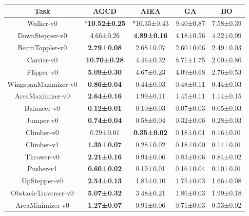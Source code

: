 \documentclass{article}
\begin{document}
    \begin{table}[H]
        \centering
        \small
        \begin{tabular}{ccccc}
            \toprule \textbf{Task} & \textbf{AGCD}        & \textbf{AIEA}      & \textbf{GA} & \textbf{BO} \\
            \midrule Walker-v0     & *\textbf{10.52±0.25} & *10.35±0.43        & 9.40±0.87   & 7.58±0.39   \\
            DownStepper-v0         & 4.66±0.26            & \textbf{4.89±0.16} & 4.18±0.56   & 4.22±0.09   \\
            BeamToppler-v0         & \textbf{2.79±0.08}   & 2.68±0.07          & 2.60±0.06   & 2.49±0.03   \\
            Carrier-v0             & \textbf{10.70±0.28}  & 4.46±0.32          & 8.71±1.75   & 2.00±0.86   \\
            Flipper-v0             & \textbf{5.09±0.30}   & 4.67±0.23          & 4.09±0.68   & 2.76±0.53   \\
            WingspanMazimizer-v0   & \textbf{0.86±0.04}   & 0.44±0.03          & 0.48±0.11   & 0.44±0.03   \\
            AreaMaximizer-v0       & \textbf{2.64±0.16}   & 1.99±0.11          & 1.45±0.11   & 1.14±0.15   \\
            Balancer-v0            & \textbf{0.12±0.01}   & 0.10±0.03          & 0.07±0.03   & 0.05±0.03   \\
            Jumper-v0              & \textbf{0.74±0.04}   & 0.58±0.04          & 0.32±0.06   & 0.28±0.03   \\
            Climber-v0             & 0.29±0.01            & \textbf{0.35±0.02} & 0.18±0.01   & 0.16±0.01   \\
            Climber-v1             & \textbf{1.35±0.07}   & 0.28±0.02          & 0.18±0.00   & 0.14±0.01   \\
            Thrower-v0             & \textbf{2.21±0.16}   & 0.94±0.06          & 0.83±0.06   & 0.84±0.02   \\
            Pusher-v1              & \textbf{0.60±0.02}   & 0.19±0.01          & 0.16±0.04   & 0.10±0.01   \\
            UpStepper-v0           & \textbf{2.54±0.13}   & 1.83±0.10          & 1.75±0.03   & 1.66±0.08   \\
            ObstacleTraverser-v0   & \textbf{5.07±0.32}   & 3.48±0.21          & 1.86±0.03   & 1.99±0.18   \\
            AreaMinimizer-v0       & \textbf{1.27±0.07}   & 0.91±0.06          & 0.71±0.03   & 0.53±0.02   \\

\end{tabular}
\end{table}
\end{document}
